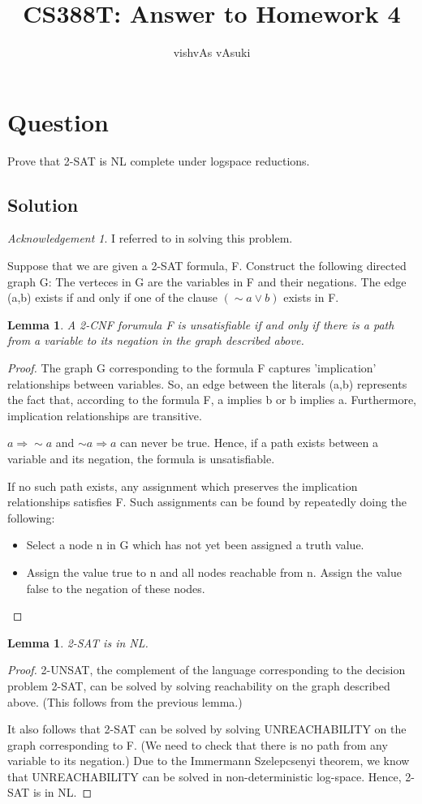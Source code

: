 \documentclass[10pt]{amsart}
\title{CS388T: Answer to Homework 4}
\author{vishvAs vAsuki}
\newtheorem{lem}[thm]{Lemma}
\theoremstyle{remark}
\newtheorem*{ack}{Acknowledgement}
\begin{document}
\maketitle

\section{Question}
Prove that 2-SAT is NL complete under logspace reductions.

\subsection{Solution}
\begin{ack}
I referred to \cite{papadimitriouCC} in solving this problem.
\end{ack}
Suppose that we are given a 2-SAT formula, F. Construct the following directed graph G: The verteces in G are the variables in F and their negations. The edge (a,b) exists if and only if one of the clause $(\sim a \vee b)$ exists in F.

\begin{lem}
A 2-CNF forumula F is unsatisfiable if and only if there is a path from a variable to its negation in the graph described above.
\end{lem}
\begin{proof}
The graph G corresponding to the formula F captures 'implication' relationships between variables. So, an edge between the literals (a,b) represents the fact that, according to the formula F, a implies b or b implies a. Furthermore, implication relationships are transitive.

$a \Rightarrow \sim a$ and $\sim a \Rightarrow  a$ can never be true. Hence, if a path exists between a variable and its negation, the formula is unsatisfiable.

If no such path exists, any assignment which preserves the implication relationships satisfies F. Such assignments can be found by repeatedly doing the following:
\begin{itemize}
 \item Select a node n in G which has not yet been assigned a truth value.
 \item Assign the value true to n and all nodes reachable from n. Assign the value false to the negation of these nodes.
\end{itemize}
\end{proof}

\begin{lem}
2-SAT is in NL.
\end{lem}
\begin{proof}
 2-UNSAT, the complement of the language corresponding to the decision problem 2-SAT, can be solved by solving reachability on the graph described above. (This follows from the previous lemma.)

It also follows that 2-SAT can be solved by solving UNREACHABILITY on the graph corresponding to F. (We need to check that there is no path from any variable to its negation.) Due to the Immermann Szelepcsenyi theorem, we know that UNREACHABILITY can be solved in non-deterministic log-space. Hence, 2-SAT is in NL.
\end{proof}
\end{document}

